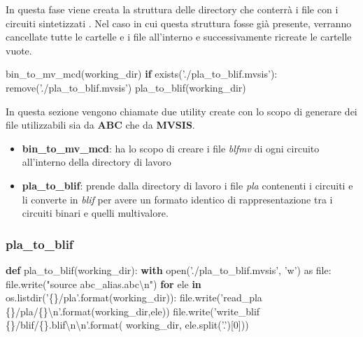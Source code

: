 \documentclass[italian,]{book}
\newenvironment{Shaded}{\begin{snugshade}}{\end{snugshade}}
\newcommand{\BuiltInTok}[1]{#1}
\newcommand{\CharTok}[1]{\textcolor[rgb]{0.31,0.60,0.02}{#1}}
\newcommand{\ControlFlowTok}[1]{\textcolor[rgb]{0.13,0.29,0.53}{\textbf{#1}}}
\newcommand{\DecValTok}[1]{\textcolor[rgb]{0.00,0.00,0.81}{#1}}
\newcommand{\ImportTok}[1]{#1}
\newcommand{\KeywordTok}[1]{\textcolor[rgb]{0.13,0.29,0.53}{\textbf{#1}}}
\newcommand{\NormalTok}[1]{#1}
\newcommand{\SpecialCharTok}[1]{\textcolor[rgb]{0.00,0.00,0.00}{#1}}
\newcommand{\StringTok}[1]{\textcolor[rgb]{0.31,0.60,0.02}{#1}}
\providecommand{\tightlist}{%
  \setlength{\itemsep}{0pt}\setlength{\parskip}{0pt}}
\begin{document}
In questa fase viene creata la struttura delle directory che conterrà i file con i circuiti sintetizzati . Nel caso in cui questa struttura fosse già presente, verranno cancellate tutte le cartelle e i file all'interno e successivamente ricreate le cartelle vuote.

\begin{Shaded}
\begin{Highlighting}[]
\NormalTok{bin_to_mv_mcd(working_dir)}
\ControlFlowTok{if}\NormalTok{ exists(}\StringTok{'./pla_to_blif.mvsis'}\NormalTok{):}
\NormalTok{  remove(}\StringTok{'./pla_to_blif.mvsis'}\NormalTok{)}
\NormalTok{pla_to_blif(working_dir)}
\end{Highlighting}
\end{Shaded}

\newpage

In questa sezione vengono chiamate due utility create con lo scopo di generare dei file utilizzabili sia da \textbf{ABC} che da \textbf{MVSIS}.

\begin{itemize}
\tightlist
\item
  \textbf{bin\_to\_mv\_mcd}: ha lo scopo di creare i file \emph{blfmv} di ogni circuito all'interno della directory di lavoro
\item
  \textbf{pla\_to\_blif}: prende dalla directory di lavoro i file \emph{pla} contenenti i circuiti e li converte in \emph{blif} per avere un formato identico di rappresentazione tra i circuiti binari e quelli multivalore.
\end{itemize}

\newpage

\hypertarget{pla_to_blif}{%
\subsubsection{pla\_to\_blif}\label{pla_to_blif}}

\begin{Shaded}
\begin{Highlighting}[]
\KeywordTok{def}\NormalTok{ pla_to_blif(working_dir):}
  \ControlFlowTok{with} \BuiltInTok{open}\NormalTok{(}\StringTok{'./pla_to_blif.mvsis'}\NormalTok{, }\StringTok{'w'}\NormalTok{) }\ImportTok{as} \BuiltInTok{file}\NormalTok{:}
    \BuiltInTok{file}\NormalTok{.write(}\StringTok{"source abc_alias.abc}\CharTok{\textbackslash{}n}\StringTok{"}\NormalTok{)}
    \ControlFlowTok{for}\NormalTok{ ele }\KeywordTok{in}\NormalTok{ os.listdir(}\StringTok{'}\SpecialCharTok{\{\}}\StringTok{/pla'}\NormalTok{.}\BuiltInTok{format}\NormalTok{(working_dir)):}
      \BuiltInTok{file}\NormalTok{.write(}\StringTok{'read_pla }\SpecialCharTok{\{\}}\StringTok{/pla/}\SpecialCharTok{\{\}}\CharTok{\textbackslash{}n}\StringTok{'}\NormalTok{.}\BuiltInTok{format}\NormalTok{(working_dir,ele))}
      \BuiltInTok{file}\NormalTok{.write(}\StringTok{'write_blif }\SpecialCharTok{\{\}}\StringTok{/blif/}\SpecialCharTok{\{\}}\StringTok{.blif}\CharTok{\textbackslash{}n\textbackslash{}n}\StringTok{'}\NormalTok{.}\BuiltInTok{format}\NormalTok{(}
\NormalTok{        working_dir, ele.split(}\StringTok{'.'}\NormalTok{)[}\DecValTok{0}\NormalTok{]))}
\end{Highlighting}
\end{Shaded}
\end{document}
